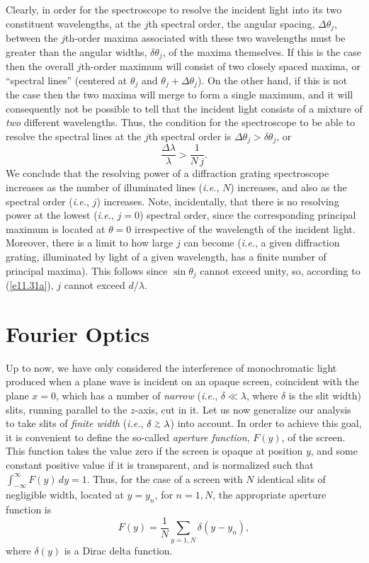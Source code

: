 Clearly, in order for the spectroscope to resolve the incident light into its  two constituent wavelengths, at the $j$th spectral order, the angular spacing, $\Delta\theta_j$, between the 
$j$th-order maxima associated with these two wavelengths must be greater than the angular widths, $\delta\theta_j$, of the
maxima themselves. If this is the case then the overall $j$th-order maximum will consist of two closely spaced maxima, or ``spectral lines''  (centered at $\theta_j$ and
$\theta_j+\Delta\theta_j$). On the other hand, if this is not the case then the two maxima will merge to form a single maximum, and it will
consequently not be possible to tell that the incident light consists of a mixture of {\em  two}\/ different wavelengths. Thus, the condition
for the spectroscope to be able to resolve the spectral lines at the $j$th spectral order is  $\Delta\theta_j>\delta\theta_j$, or
\begin{equation}
\frac{\Delta\lambda}{\lambda} > \frac{1}{N\,j}.
\end{equation}
We conclude that the resolving power of a diffraction grating spectroscope increases as the number of illuminated lines
({\em i.e.}, $N$) increases, and also as the spectral order ({\em i.e.}, $j$) increases. Note, incidentally, that there
is no resolving power at the lowest ({\em i.e.}, $j=0$) spectral order, since the corresponding principal maximum is located at $\theta=0$
irrespective of the wavelength of the incident light. Moreover, there is a limit to how large $j$ can become ({\em i.e.}, a given diffraction
grating, illuminated by light of a given wavelength, has a finite number of principal maxima). This follows since $\sin\theta_j$ cannot
exceed unity, so, according to (\ref{e11.31a}),  $j$ cannot exceed $d/\lambda$. 

\section{Fourier Optics}
Up to now, we have only considered the interference of monochromatic light produced  when a plane wave is incident
on an opaque screen, coincident with the plane $x=0$, which has a number of {\em narrow}\/ ({\em i.e.}, $\delta\ll \lambda$,
where $\delta$ is the slit width)  slits, running parallel to the $z$-axis, cut in it.  Let us now generalize our analysis
to take slits of {\em finite width}\/ ({\em i.e.}, $\delta\stackrel {_{\normalsize>}}{_{\normalsize \sim}} \lambda$) into account. In order to achieve this goal, it is convenient to
define the so-called {\em aperture function}, $F(y)$, of the screen. This function takes the value zero if the screen is
opaque at position $y$, and some constant positive value if it is transparent, and is normalized such that $\int_{-\infty}^\infty F(y)\,dy = 1$.  Thus, for the case of a screen with $N$   identical 
slits of negligible width, located at $y=y_n$, for $n=1,N$, the appropriate aperture function is 
\begin{equation}
F(y)=\frac{1}{N}\sum_{y=1,N} \delta(y-y_n),
\end{equation}
where $\delta(y)$ is a Dirac delta function.

